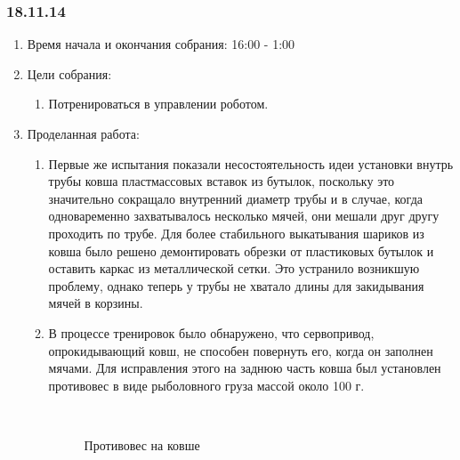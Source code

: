 \subsubsection{18.11.14}

\begin{enumerate}
	\item Время начала и окончания собрания:
	16:00 - 1:00
	\item Цели собрания:
	\begin{enumerate}
	  \item Потренироваться в управлении роботом.
	  
    \end{enumerate}
	\item Проделанная работа:
	\begin{enumerate}
	  \item Первые же испытания показали несостоятельность идеи установки внутрь трубы ковша пластмассовых вставок из бутылок, поскольку это значительно сокращало внутренний диаметр трубы и в случае, когда одноваременно захватывалось несколько мячей, они мешали друг другу проходить по трубе. Для более стабильного выкатывания шариков из ковша было решено демонтировать обрезки от пластиковых бутылок и оставить каркас из металлической сетки. Это устранило возникшую проблему, однако теперь у трубы не хватало длины для закидывания мячей в корзины.
      
      \item В процессе тренировок было обнаружено, что сервопривод, опрокидывающий ковш, не способен повернуть его, когда он заполнен мячами. Для исправления этого на заднюю часть ковша был установлен противовес в виде рыболовного груза массой около 100 г.
      
      \begin{figure}[H]
      	\begin{minipage}[h]{0.2\linewidth}
      		\center  
      	\end{minipage}
      	\begin{minipage}[h]{0.6\linewidth}
      		\caption{Противовес на ковше}
      	\end{minipage}
      \end{figure}
      

\end{enumerate}
\end{enumerate}
